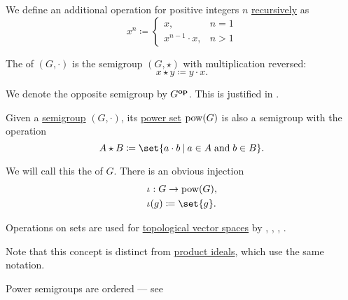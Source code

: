 \begin{definition}
\begin{thmenum}[series=def:semigroup]
     We define an additional  operation for positive integers \( n \) \hyperref[thm:omega_recursion]{recursively} as
    \begin{equation}\label{eq:def:semigroup/exponentiation}
      x^n \coloneqq \begin{cases}
        x,               &n = 1 \\
        x^{n-1} \cdot x, &n > 1
      \end{cases}
    \end{equation}

    \mimprovised The  of \( (G, \cdot) \) is the semigroup \( (G, \star) \) with multiplication reversed:
    \begin{equation*}
      x \star y \coloneqq y \cdot x.
    \end{equation*}

    We denote the opposite semigroup by \( G^\oppos \). This is justified in .
  \end{thmenum}
\end{definition}

\begin{definition}\label{def:power_semigroup}
  Given a \hyperref[def:semigroup]{semigroup} \( (G, \cdot) \), its \hyperref[def:basic_set_operations/power_set]{power set} \( \operatorname{pow}(G) \) is also a semigroup with the operation
  \begin{equation*}
    A \star B \coloneqq \set{ a \cdot b \given a \in A \T{and} b \in B }.
  \end{equation*}

  We will call this the  of \( G \). There is an obvious injection
  \begin{equation*}
    \begin{aligned}
      &\iota: G \to \pow(G), \\
      &\iota(g) \coloneqq \set{ g }.
    \end{aligned}
  \end{equation*}
\end{definition}
\begin{comments}
  \item Operations on sets are used for \hyperref[def:topological_vector_space]{topological vector spaces} by , , , .

  \item Note that this concept is distinct from \hyperref[def:semiring_ideal/product]{product ideals}, which use the same notation.

  \item Power semigroups are ordered --- see 
\end{comments}

